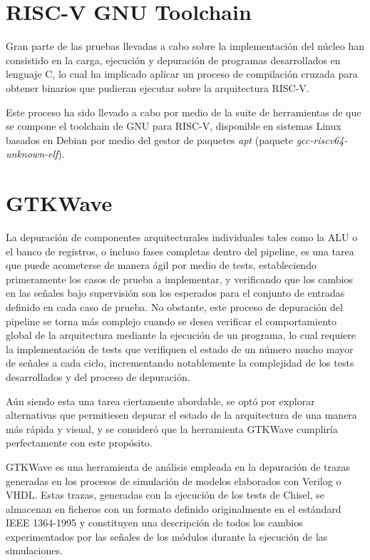 \section{RISC-V GNU Toolchain}

Gran parte de las pruebas llevadas a cabo sobre la implementación del núcleo han consistido en la carga, ejecución y depuración de programas desarrollados en lenguaje C, lo cual ha implicado aplicar un proceso de compilación cruzada para obtener binarios que pudieran ejecutar sobre la arquitectura RISC-V.

Este proceso ha sido llevado a cabo por medio de la suite de herramientas de que se compone el toolchain de GNU para RISC-V\cite{riscvtoolchain}, disponible en sistemas Linux basados en Debian por medio del gestor de paquetes \textit{apt} (paquete \textit{gcc-riscv64-unknown-elf}).

\section{GTKWave}

La depuración de componentes arquitecturales individuales tales como la ALU o el banco de registros, o incluso fases completas dentro del pipeline, es una tarea que puede acometerse de manera ágil por medio de tests, estableciendo primeramente los casos de prueba a implementar, y verificando que los cambios en las señales bajo supervisión son los esperados para el conjunto de entradas definido en cada caso de prueba. No obstante, este proceso de depuración del pipeline se torna más complejo cuando se desea verificar el comportamiento global de la arquitectura mediante la ejecución de un programa, lo cual requiere la implementación de tests que verifiquen el estado de un número mucho mayor de señales a cada ciclo, incrementando notablemente la complejidad de los tests desarrollados y del proceso de depuración.

Aún siendo esta una tarea ciertamente abordable, se optó por explorar alternativas que permitiesen depurar el estado de la arquitectura de una manera más rápida y visual, y se consideró que la herramienta GTKWave cumpliría perfectamente con este propósito.

GTKWave es una herramienta de análisis empleada en la depuración de trazas generadas en los procesos de simulación de modelos elaborados con Verilog o VHDL. Estas trazas, generadas con la ejecución de los tests de Chisel, se almacenan en ficheros con un formato definido originalmente en el estándard IEEE 1364-1995\cite{IEEE1364} y constituyen una descripción de todos los cambios experimentados por las señales de los módulos durante la ejecución de las simulaciones.

